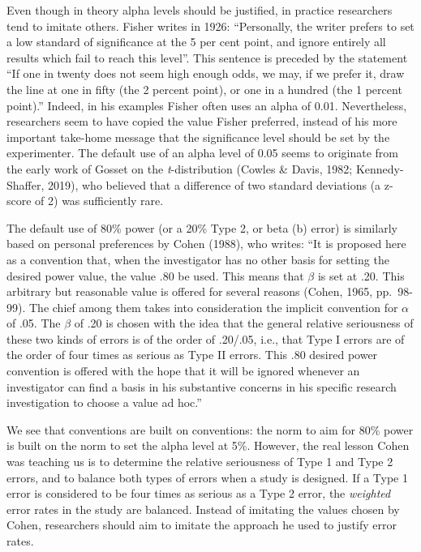 \documentclass[
  english,
  ,jou,floatsintext]{apa6}
\begin{document}
Even though in theory alpha levels should be justified, in practice researchers tend to imitate others. Fisher writes in 1926: ``Personally, the writer prefers to set a low standard of significance at the 5 per cent point, and ignore entirely all results which fail to reach this level''. This sentence is preceded by the statement ``If one in twenty does not seem high enough odds, we may, if we prefer it, draw the line at one in fifty (the 2 percent point), or one in a hundred (the 1 percent point).'' Indeed, in his examples Fisher often uses an alpha of 0.01. Nevertheless, researchers seem to have copied the value Fisher preferred, instead of his more important take-home message that the significance level should be set by the experimenter. The default use of an alpha level of 0.05 seems to originate from the early work of Gosset on the \emph{t}-distribution (Cowles \& Davis, 1982; Kennedy-Shaffer, 2019), who believed that a difference of two standard deviations (a z-score of 2) was sufficiently rare.

The default use of 80\% power (or a 20\% Type 2, or beta (b) error) is similarly based on personal preferences by Cohen (1988), who writes: ``It is proposed here as a convention that, when the investigator has no other basis for setting the desired power value, the value .80 be used. This means that \(\beta\) is set at .20. This arbitrary but reasonable value is offered for several reasons (Cohen, 1965, pp.~98-99). The chief among them takes into consideration the implicit convention for \(\alpha\) of .05. The \(\beta\) of .20 is chosen with the idea that the general relative seriousness of these two kinds of errors is of the order of .20/.05, i.e., that Type I errors are of the order of four times as serious as Type II errors. This .80 desired power convention is offered with the hope that it will be ignored whenever an investigator can find a basis in his substantive concerns in his specific research investigation to choose a value ad hoc.''

We see that conventions are built on conventions: the norm to aim for 80\% power is built on the norm to set the alpha level at 5\%. However, the real lesson Cohen was teaching us is to determine the relative seriousness of Type 1 and Type 2 errors, and to balance both types of errors when a study is designed. If a Type 1 error is considered to be four times as serious as a Type 2 error, the \emph{weighted} error rates in the study are balanced. Instead of imitating the values chosen by Cohen, researchers should aim to imitate the approach he used to justify error rates.
\end{document}
